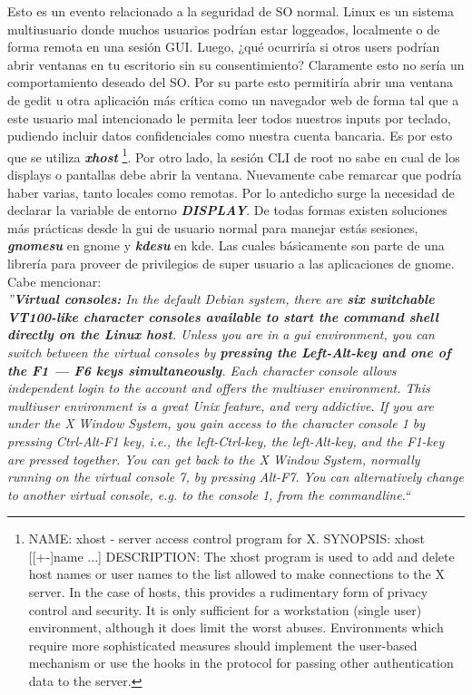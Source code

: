 \documentclass[a4paper,11pt,spanish]{article} %
\begin{document}
Esto es un evento relacionado a la seguridad de SO normal. Linux es un sistema multiusuario 
donde muchos usuarios podrían estar loggeados, localmente o de forma remota en una sesión GUI.
Luego, ¿qué ocurriría si otros users podrían abrir ventanas en tu escritorio sin su consentimiento?
Claramente esto no sería un comportamiento deseado del SO. Por su parte esto permitiría abrir una 
ventana de gedit u otra aplicación más crítica como un navegador web de forma tal que a este usuario
mal intencionado le permita leer todos nuestros inputs por teclado, pudiendo incluir datos confidenciales
como nuestra cuenta bancaria. Es por esto que se utiliza \textbf{\emph{xhost}} \footnote{NAME:
xhost - server access control program for X. SYNOPSIS: xhost [[+-]name ...] DESCRIPTION: The xhost
program is used to add and delete host names or user names to the list allowed to make connections
to the X server.  In the case of hosts, this provides a rudimentary form of privacy control and security.
It is only sufficient  for  a  workstation  (single user)  environment, although it does limit the
worst abuses.  Environments which require more sophisticated measures should implement
the user-based mechanism or use the hooks in the protocol for passing other authentication data
to the server.\cite{xhost}}.
Por otro lado, la sesión CLI de root no sabe en cual de los displays o pantallas debe abrir la ventana.
Nuevamente cabe remarcar que podría haber varias, tanto locales como remotas. Por lo antedicho surge
la necesidad de declarar la variable de entorno \textbf{\emph{DISPLAY}}. De todas formas existen 
soluciones más prácticas desde la \ac{gui} de usuario normal para manejar estás sesiones,
\textbf{\emph{gnomesu}} en \ac{gnome} y \textbf{\emph{kdesu}} en \ac{kde}. Las cuales básicamente son parte
de una librería para proveer de privilegios de super usuario a las aplicaciones de \ac{gnome}.\\

Cabe mencionar:\\

\emph{''\textbf{Virtual consoles:} In the default Debian system, there are \textbf{six switchable VT100-like character consoles available
to start the command shell directly on the Linux host}. Unless you are in a \ac{gui} environment, 
you can switch between the virtual consoles by \textbf{pressing the Left-Alt-key and one of the F1 — F6
keys simultaneously}. Each character console allows independent login to the account and offers the
multiuser environment. This multiuser environment is a great Unix feature, and very addictive.
If you are under the X Window System, you gain access to the character console 1 by pressing
Ctrl-Alt-F1 key, i.e., the left-Ctrl-key, the left-Alt-key, and the F1-key are pressed together.
You can get back to the X Window System, normally running on the virtual console 7, by pressing Alt-F7.
You can alternatively change to another virtual console, e.g. to the console 1, from the commandline.``}
\end{document}
